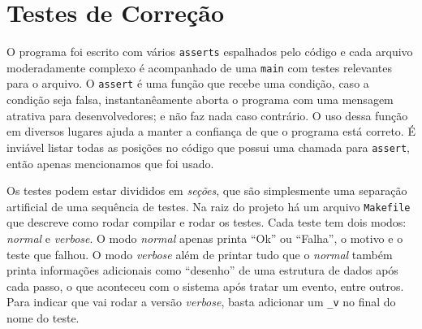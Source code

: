 \documentclass[a4paper]{article}
\newcommand{\arq}{\texttt}
\newcommand{\inlcode}{\texttt}
\begin{document}
\newpage
\section{Testes de Correção}
O programa foi escrito com vários \inlcode{asserts}
espalhados pelo código
e cada arquivo moderadamente complexo é acompanhado
de uma \inlcode{main} com testes relevantes para o arquivo.
O \inlcode{assert} é uma função que recebe uma condição,
caso a condição seja falsa,
instantanêamente aborta o programa com uma mensagem
atrativa para desenvolvedores;
e não faz nada caso contrário.
O uso dessa função em diversos lugares ajuda a
manter a confiança de que o programa está correto.
É inviável listar todas as posições no código
que possui uma chamada para \inlcode{assert},
então apenas mencionamos que foi usado.

Os testes podem estar divididos em \emph{seções},
que são simplesmente uma separação artificial
de uma sequência de testes.
Na raiz do projeto há um arquivo \arq{Makefile} que descreve
como rodar compilar e rodar os testes.
Cada teste tem dois modos:
\emph{normal} e \emph{verbose}.
O modo \emph{normal} apenas printa
``Ok'' ou ``Falha'', o motivo e o teste que falhou.
O modo \emph{verbose} além de printar tudo que o \emph{normal}
também printa informações adicionais
como ``desenho'' de uma estrutura de dados após cada passo,
o que aconteceu com o sistema após tratar um evento, entre outros.
Para indicar que vai rodar a versão \emph{verbose},
basta adicionar um \inlcode{\_v} no final do nome do teste.
\end{document}
